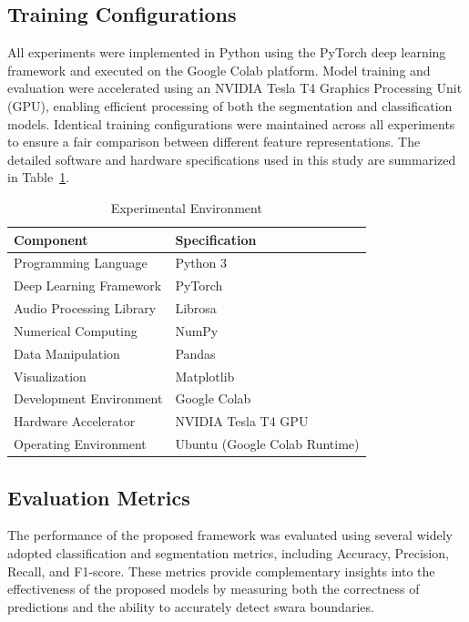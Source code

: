 
\subsection{Training Configurations}

All experiments were implemented in Python using the PyTorch deep learning framework and executed on the Google Colab platform. Model training and evaluation were accelerated using an NVIDIA Tesla T4 Graphics Processing Unit (GPU), enabling efficient processing of both the segmentation and classification models. Identical training configurations were maintained across all experiments to ensure a fair comparison between different feature representations. The detailed software and hardware specifications used in this study are summarized in Table~\ref{tab:experimental-environment}.

\begin{table}[H]
\centering
\caption{Experimental Environment}
\label{tab:experimental-environment}
\begin{tabular}{ll}
\toprule
\textbf{Component} & \textbf{Specification} \\
\midrule
Programming Language & Python 3 \\
Deep Learning Framework & PyTorch \\
Audio Processing Library & Librosa \\
Numerical Computing & NumPy \\
Data Manipulation & Pandas \\
Visualization & Matplotlib \\
Development Environment & Google Colab \\
Hardware Accelerator & NVIDIA Tesla T4 GPU \\
Operating Environment & Ubuntu (Google Colab Runtime) \\
\bottomrule
\end{tabular}
\end{table}

\subsection{Evaluation Metrics}

The performance of the proposed framework was evaluated using several widely adopted classification and segmentation metrics, including Accuracy, Precision, Recall, and F1-score. These metrics provide complementary insights into the effectiveness of the proposed models by measuring both the correctness of predictions and the ability to accurately detect swara boundaries.

